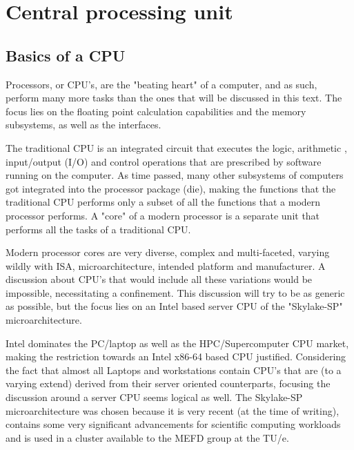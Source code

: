 \chapter{Central processing unit}

\section{Basics of a CPU}

\hspace{4mm}Processors, or CPU's, are the "beating heart" of a computer, and as such, perform many more tasks than the ones that will be discussed in this text. The focus lies on the floating point calculation capabilities and the memory subsystems, as well as the interfaces.\vspace{5mm}

The traditional CPU\autocite[]{wiki_cpu} is an integrated circuit that executes the logic, arithmetic , input/output (I/O) and control operations that are prescribed by software running on the computer. As time passed, many other subsystems of computers got integrated into the processor package (die), making the functions that the traditional CPU performs only a subset of all the functions that a modern processor performs. A "core" of a modern processor is a separate unit that performs all the tasks of a traditional CPU.\vspace{5mm}

Modern processor cores are very diverse, complex and multi-faceted, varying wildly with ISA, microarchitecture, intended platform and manufacturer. A discussion about CPU's that would include all these variations would be impossible, necessitating a confinement. This discussion will try to be as generic as possible, but the focus lies on an Intel based server CPU of the "Skylake-SP" microarchitecture.\vspace{5mm}

Intel dominates the PC/laptop as well as the HPC/Supercomputer CPU market, making the restriction towards an Intel x86-64 based CPU justified. Considering the fact that almost all Laptops and workstations contain CPU's that are (to a varying extend) derived from their server oriented counterparts, focusing the discussion around a server CPU seems logical as well. The Skylake-SP microarchitecture was chosen because it is very recent (at the time of writing), contains some very significant advancements for scientific computing workloads and is used in a cluster available to the MEFD group at the TU/e.

